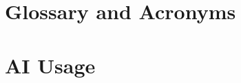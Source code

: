 \documentclass[
    profile=tubs-isf,
	verbose,
	english,
	type=bachelor-thesis, %
	field={{Computer Science}}, %
	license=CCBY, %
	paper=a4,  %
	citeMarginparScope=section, %
	pageInFloatRef=false, %
]{thesis}
\begin{document}
\hideindraft{
	\frontmatter
		\maketitle
	
		
		
	
		\tableofcontents
		{
			\listoffigures
			\listoftables
			\lstlistoflistings
		}
	}
	
	\mainmatter
	
	
	
	
	
	
	

	\backmatter
	\printbibliography

	\let\clearpage\newpage
	\let\cleardoublepage\newpage
	\chapter{Glossary and Acronyms} %
	\printglossaries
	\chapter{AI Usage} %
	\printaistatement
\end{document}
